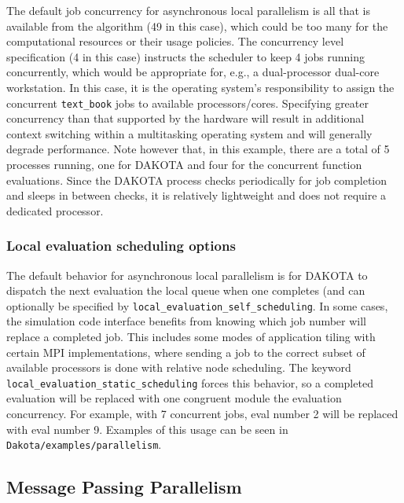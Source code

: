 The default job concurrency for asynchronous local parallelism is all
that is available from the algorithm (49 in this case), which could be
too many for the computational resources or their usage policies.  The
concurrency level specification (4 in this case) instructs the
scheduler to keep 4 jobs running concurrently, which would be
appropriate for, e.g., a dual-processor dual-core workstation.  In
this case, it is the operating system's responsibility to assign the
concurrent \texttt{text\_book} jobs to available processors/cores.
Specifying greater concurrency than that supported by the hardware
will result in additional context switching within a multitasking
operating system and will generally degrade performance.  Note however
that, in this example, there are a total of 5 processes running, one
for DAKOTA and four for the concurrent function evaluations.  Since
the DAKOTA process checks periodically for job completion and sleeps
in between checks, it is relatively lightweight and does not require a
dedicated processor.

\subsubsection{Local evaluation scheduling options}\label{parallel:SLP:local:sched}

The default behavior for asynchronous local parallelism is for DAKOTA
to dispatch the next evaluation the local queue when one completes
(and can optionally be specified by
\texttt{local\_evaluation\_self\_scheduling}.  In some cases, the
simulation code interface benefits from knowing which job number will
replace a completed job.  This includes some modes of application
tiling with certain MPI implementations, where sending a job to the
correct subset of available processors is done with relative node
scheduling.  The keyword
\texttt{local\_evaluation\_static\_scheduling} forces this behavior,
so a completed evaluation will be replaced with one congruent module
the evaluation concurrency.  For example, with 7 concurrent jobs, eval
number 2 will be replaced with eval number 9.  Examples of this usage
can be seen in \texttt{Dakota/examples/parallelism}.


\subsection{Message Passing Parallelism}\label{parallel:SLP:message}

